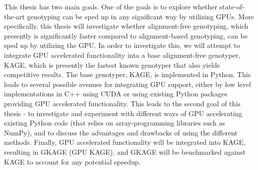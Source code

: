 This thesis has two main goals.
One of the goals is to explore whether state-of-the-art genotyping can be sped up in any significant way by utilizing GPUs.
More specifically, this thesis will investigate whether alignment-free genotyping, which presently is significantly faster compared to alignment-based genotyping, can be sped up by utilizing the GPU.
In order to investigate this, we will attempt to integrate GPU accelerated functionality into a base alignment-free genotyper, KAGE, which is presently the fastest known genotyper that also yields competitive results.
The base genotyper, KAGE, is implemented in Python.
This leads to several possible avenues for integrating GPU support, either by low level implementations in C++ using CUDA or using existing Python packages providing GPU accelerated functionality.
This leads to the second goal of this thesis - to investigate and experiment with different ways of GPU accelerating existing Python code (that relies on array-programming libraries such as NumPy), and to discuss the advantages and drawbacks of using the different methods.
Finally, GPU accelerated functionality will be integrated into KAGE, resulting in GKAGE (GPU KAGE), and GKAGE will be benchmarked against KAGE to account for any potential speedup.
